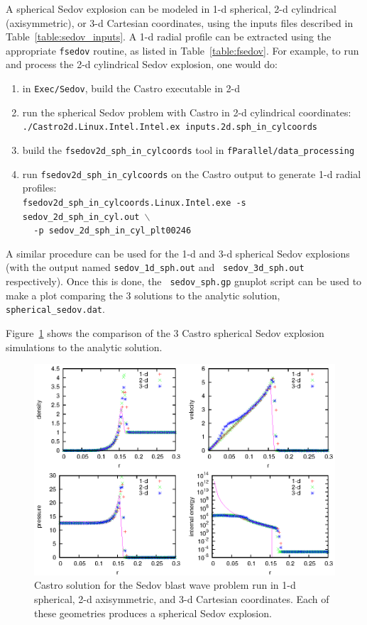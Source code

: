 A spherical Sedov explosion can be modeled in 1-d spherical, 2-d
cylindrical (axisymmetric), or 3-d Cartesian coordinates, using the
inputs files described in Table~\ref{table:sedov_inputs}.  A 1-d radial
profile can be extracted using the appropriate {\tt fsedov} routine,
as listed in Table~\ref{table:fsedov}.  For example, to run and process
the 2-d cylindrical Sedov explosion, one would do:
\begin{enumerate}
\item in {\tt Exec/Sedov}, build the Castro executable in 2-d
\item run the spherical Sedov problem with Castro in 2-d cylindrical coordinates: \\
 {\tt ./Castro2d.Linux.Intel.Intel.ex inputs.2d.sph\_in\_cylcoords} 
\item build the {\tt fsedov2d\_sph\_in\_cylcoords} tool in {\tt fParallel/data\_processing}
\item run {\tt fsedov2d\_sph\_in\_cylcoords} on the Castro output to generate 1-d radial
 profiles: \\
 {\tt fsedov2d\_sph\_in\_cylcoords.Linux.Intel.exe -s sedov\_2d\_sph\_in\_cyl.out $\mathtt{\backslash}$ } \\
 $~~~~~${\tt -p sedov\_2d\_sph\_in\_cyl\_plt00246} 
\end{enumerate}
A similar procedure can be used for the 1-d and 3-d spherical Sedov
explosions (with the output named {\tt sedov\_1d\_sph.out} and {\tt
  sedov\_3d\_sph.out} respectively).  Once this is done, the {\tt
  sedov\_sph.gp} gnuplot script can be used to make a plot comparing
the 3 solutions to the analytic solution, {\tt spherical\_sedov.dat}.

Figure~\ref{fig:sedov_sph} shows the comparison of the 3 Castro
spherical Sedov explosion simulations to the analytic solution.

\begin{figure}[t]
\centering
\includegraphics[width=5.0in]{CastroVerification/sedov_sph}
\caption{\label{fig:sedov_sph} Castro solution for the Sedov blast wave problem
  run in 1-d spherical, 2-d axisymmetric, and 3-d Cartesian coordinates.
  Each of these geometries produces a spherical Sedov explosion.}
\end{figure}


